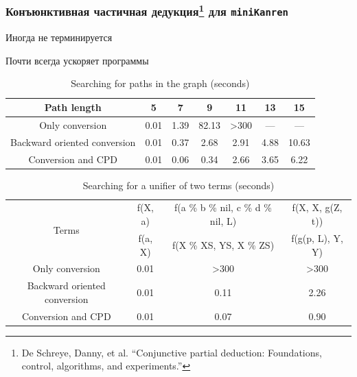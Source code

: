 \documentclass{beamer}
\newcommand{\miniKanren}{\texttt{miniKanren}}
\begin{document}
\begin{frame}[fragile]
  \transwipe[direction=90]
  \frametitle{Конъюнктивная частичная дедукция\footnote{De Schreye, Danny, et al. ``Conjunctive partial deduction: Foundations, control, algorithms, and experiments.'' } для \miniKanren}

\begin{center}
  Иногда не терминируется

  Почти всегда ускоряет программы
\end{center}

  \begin{table}
    \footnotesize
    \centering
    \begin{tabular}{c|c|c|c|c|c|c}
    Path length                   & 5      & 7     & 9      & 11      & 13     & 15        \\
    \hline\hline
    Only conversion               & 0.01  & 1.39 &  82.13 & >300     & ---      & ---     \\
    \hline
    Backward oriented conversion  & 0.01 & 0.37 &  2.68 & 2.91   & 4.88    & 10.63   \\
    \hline
    Conversion and CPD            & 0.01  & 0.06 &  0.34 & 2.66   & 3.65    & 6.22  
    \end{tabular}
    
     \caption{Searching for paths in the graph (seconds)}
        \label{tab:is_path}
    \end{table}

    \begin{table}
      \tiny
      \centering
      \begin{tabular}{c|c|c|c}
      \multirow{ 2}{*}{Terms} &
      f(X, a) & f(a \% b \% nil, c \% d \% nil, L) & f(X, X, g(Z, t))  \\
      \cline{2-4} &
      f(a, X) & f(X \% XS, YS, X \% ZS) & f(g(p, L), Y, Y)  \\
      \hline\hline
      Only conversion               & 0.01  &  >300 & >300 \\
      \hline
      Backward oriented conversion  & 0.01  &  0.11 & 2.26  \\
      \hline
      Conversion and CPD            & 0.01  &  0.07 & 0.90  \\
      \end{tabular}
       \caption{Searching for a unifier of two terms (seconds)}
          \label{tab:uni}
      \end{table}
\end{frame}
\end{document}
